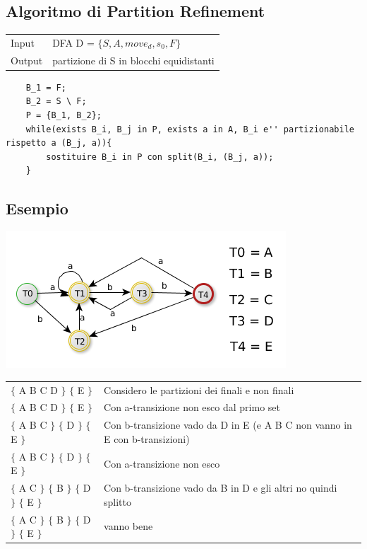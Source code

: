 \subsection{Algoritmo di Partition Refinement}
\begin{center}
    \begin{tabular}{ll}
        Input   &   DFA D = $\{ S, A,move_d, s_0, F\}$\\
        Output  &   partizione di S in blocchi equidistanti\\ 
    \end{tabular}
\end{center}

\begin{lstlisting}
    B_1 = F;
    B_2 = S \ F;
    P = {B_1, B_2};
    while(exists B_i, B_j in P, exists a in A, B_i e'' partizionabile rispetto a (B_j, a)){
        sostituire B_i in P con split(B_i, (B_j, a));
    }
\end{lstlisting}

\subsection{Esempio}

\begin{center}
	\includegraphics[scale=0.5]{Chapters/Img/c02_04.png}\\
\end{center} 

\begin{tabular}{ll}
    $\{$ A B C D $\}$ $\{$ E $\}$                       & Considero le partizioni dei finali e non finali \\  
    $\{$ A B C D $\}$ $\{$ E $\}$                       & Con a-transizione non esco dal primo set\\  
    $\{$ A B C $\}$ $\{$ D $\}$ $\{$ E $\}$             & Con b-transizione vado da D in E (e A B C non vanno in E con b-transizioni)\\  
    $\{$ A B C $\}$ $\{$ D $\}$ $\{$ E $\}$             & Con a-transizione non esco\\    
    $\{$ A C $\}$ $\{$ B $\}$ $\{$ D $\}$ $\{$ E $\}$   & Con b-transizione vado da B in D e gli altri no quindi splitto \\
    $\{$ A C $\}$ $\{$ B $\}$ $\{$ D $\}$ $\{$ E $\}$   & vanno bene \\
\end{tabular}\\[5pt]

